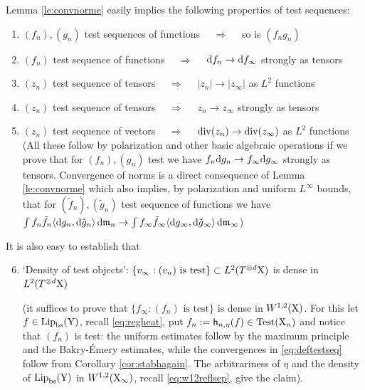 \documentclass[11pt]{article}
\numberwithin{equation}{section}
\newcommand{\X}{{\rm X}}
\newcommand{\Y}{{\rm Y}}
\newcommand{\mm}{{\mathfrak m}}
\renewcommand{\d}{{\rm d}}
\renewcommand{\div}{{\rm div}}
\newcommand{\Lip}{{\rm Lip}}
\newcommand{\bs}{{\rm bs}}
\newcommand{\h}{{\sf h}} %
\newcommand\la{\langle}
\newcommand\ra{\rangle}
\newcommand{\test}{{\rm Test}}
\begin{document}
Lemma \ref{le:convnorme} easily implies the following properties of test sequences:
\begin{enumerate}[label=(\alph*)]
\item\label{it:prodtest2}  $(f_n),(g_n)$  test sequences of functions $\quad\Rightarrow\quad$ so is $(f_ng_n)$
\item $(f_n)$ test sequence of functions  $\quad\Rightarrow\quad$ $\d f_n\to\d f_\infty$ strongly as tensors
\item\label{it:convnormtest} $(z_n)$ test sequence of tensors  $\quad\Rightarrow\quad$ $|z_n|\to |z_\infty|$ as $L^2$ functions
\item $(z_n)$ test sequence of tensors  $\quad\Rightarrow\quad$ $z_n\to z_\infty$ strongly as tensors
\item\label{it:convdiv2} $(z_n)$ test sequence of vectors  $\quad\Rightarrow\quad$ $\div(z_n)\to \div(z_\infty)$ as $L^2$ functions\\
{\footnotesize (All these follow by polarization and other basic algebraic operations if we prove that for $(f_n),(g_n)$ test we have $f_n\d g_n\to f_\infty\d g_\infty$ strongly as tensors. Convergence of norms is a direct consequence of Lemma \ref{le:convnorme} which also implies, by polarization and uniform $L^\infty$ bounds, that for $(\tilde f_n),(\tilde g_n)$ test sequence of functions we have $\int f_n\tilde f_n\la\d g_n,\d\tilde g_n\ra\,\d\mm_n\to\int f_\infty\tilde f_\infty\la\d g_\infty,\d\tilde g_\infty\ra\,\d\mm_\infty$)}
\end{enumerate}

\medskip

\noindent It is also easy to establish that
\begin{enumerate}[label=(\alph*)]\setcounter{enumi}{5}
\item\label{it:testd} `Density of test objects':  $\{v_\infty:(v_n)\text{ is test}\}\subset L^2(T^{\otimes d}\X) $ is dense in $L^2(T^{\otimes d}\X)$ 

{\footnotesize {\vspace{-5pt}}(it suffices to prove that $\{f_\infty: (f_n)\text{ is test}\}$ is dense in $W^{1,2}(\X)$. For this let $f\in\Lip_\bs(\Y)$, recall \eqref{eq:regheat}, put   $f_n:=\h_{n,\eta}(f)\in\test(\X_n)$ and notice that $(f_n)$ is test: the uniform estimates follow by the maximum principle and the Bakry-\'Emery estimates, while the convergences in  \eqref{eq:deftestseq} follow from Corollary \ref{cor:stabhagain}. The arbitrariness of $\eta$ and the density of $\Lip_\bs(\Y)$ in $W^{1,2}(\X_\infty)$, recall \eqref{eq:w12reflsep}, give the claim).}

\end{enumerate}
\end{document}
